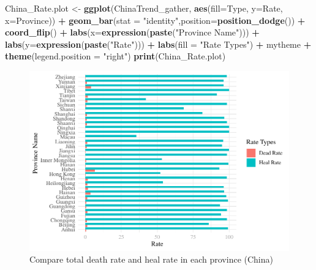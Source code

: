 \documentclass[12pt,]{article}
\newenvironment{Shaded}{\begin{snugshade}}{\end{snugshade}}
\newcommand{\DataTypeTok}[1]{\textcolor[rgb]{0.13,0.29,0.53}{#1}}
\newcommand{\KeywordTok}[1]{\textcolor[rgb]{0.13,0.29,0.53}{\textbf{#1}}}
\newcommand{\NormalTok}[1]{#1}
\newcommand{\OperatorTok}[1]{\textcolor[rgb]{0.81,0.36,0.00}{\textbf{#1}}}
\newcommand{\StringTok}[1]{\textcolor[rgb]{0.31,0.60,0.02}{#1}}
\begin{document}
\begin{Shaded}
\begin{Highlighting}[]
\NormalTok{China_Rate.plot <-}\StringTok{ }\KeywordTok{ggplot}\NormalTok{(ChinaTrend_gather, }\KeywordTok{aes}\NormalTok{(}\DataTypeTok{fill=}\NormalTok{Type, }\DataTypeTok{y=}\NormalTok{Rate, }\DataTypeTok{x=}\NormalTok{Province)) }\OperatorTok{+}\StringTok{ }
\StringTok{  }\KeywordTok{geom_bar}\NormalTok{(}\DataTypeTok{stat =} \StringTok{"identity"}\NormalTok{,}\DataTypeTok{position=}\KeywordTok{position_dodge}\NormalTok{()) }\OperatorTok{+}
\StringTok{  }\KeywordTok{coord_flip}\NormalTok{() }\OperatorTok{+}
\StringTok{  }\KeywordTok{labs}\NormalTok{(}\DataTypeTok{x=}\KeywordTok{expression}\NormalTok{(}\KeywordTok{paste}\NormalTok{(}\StringTok{"Province Name"}\NormalTok{))) }\OperatorTok{+}\StringTok{ }
\StringTok{  }\KeywordTok{labs}\NormalTok{(}\DataTypeTok{y=}\KeywordTok{expression}\NormalTok{(}\KeywordTok{paste}\NormalTok{(}\StringTok{"Rate"}\NormalTok{))) }\OperatorTok{+}
\StringTok{  }\KeywordTok{labs}\NormalTok{(}\DataTypeTok{fill =} \StringTok{"Rate Types"}\NormalTok{) }\OperatorTok{+}
\StringTok{  }\NormalTok{mytheme }\OperatorTok{+}\StringTok{ }
\StringTok{  }\KeywordTok{theme}\NormalTok{(}\DataTypeTok{legend.position =} \StringTok{"right"}\NormalTok{) }
\KeywordTok{print}\NormalTok{(China_Rate.plot)}
\end{Highlighting}
\end{Shaded}

\begin{figure}
\centering
\includegraphics{Feng_ENV872_Project_files/figure-latex/China_Rate.plot-1.pdf}
\caption{Compare total death rate and heal rate in each province
(China)}
\end{figure}
\end{document}
